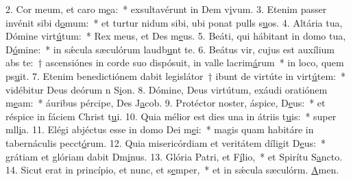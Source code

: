 2. Cor meum, et caro m\uline{e}a:~* exsultavérunt in Dem v\uline{i}vum.
3. Etenim passer invénit sibi d\uline{o}mum:~* et turtur nidum sibi, ubi ponat pulls s\uline{u}os.
4. Altária tua, Dómine virt\uline{ú}tum:~* Rex meus, et Des m\uline{e}us.
5. Beáti, qui hábitant in domo tua, D\uline{ó}mine:~* in sǽcula sæculórum laudb\uline{u}nt te.
6. Beátus vir, cujus est auxílium abs te:~† ascensiónes in corde suo dispósuit, in valle lacrim\uline{á}rum~* in loco, quem ps\uline{u}it.
7. Etenim benedictiónem dabit legislátor~† ibunt de virtúte in virt\uline{ú}tem:~* vidébitur Deus deórum n S\uline{i}on.
8. Dómine, Deus virtútum, exáudi oratiónem m\uline{e}am:~* áuribus pércipe, Des J\uline{a}cob.
9. Protéctor noster, áspice, D\uline{e}us:~* et réspice in fáciem Christ t\uline{u}i.
10. Quia mélior est dies una in átriis t\uline{u}is:~* super mll\uline{i}a.
11. Elégi abjéctus esse in domo Dei m\uline{e}i:~* magis quam habitáre in tabernáculis pecct\uline{ó}rum.
12. Quia misericórdiam et veritátem díligit D\uline{e}us:~* grátiam et glóriam dabit Dm\uline{i}nus.
13. Glória Patri, et F\uline{í}lio,~* et Spirítu S\uline{a}ncto.
14. Sicut erat in princípio, et nunc, et s\uline{e}mper,~* et in sǽcula sæculórm. \uline{A}men.
